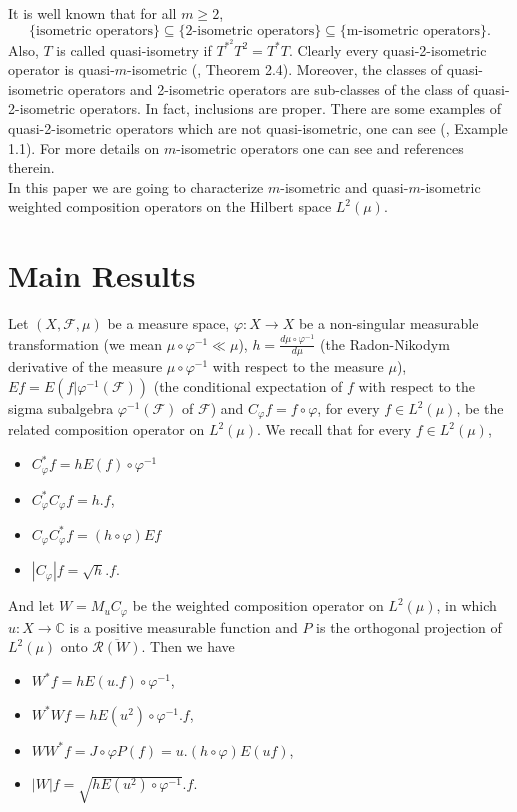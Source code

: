 \documentclass{amsart}
\theoremstyle{definition}\newtheorem{defn}[thm]{Definition}
\theoremstyle{remark}
\numberwithin{equation}{section}
\begin{document}
It is well known that for all $m\geq 2$,
$$\{\text{isometric operators}\} \subseteq \{\text{2-isometric operators}\} \subseteq \{\text{m-isometric operators}\}.$$
Also, $T$ is called quasi-isometry if $T^{*^2}T^2=T^*T$. Clearly every
quasi-2-isometric operator is quasi-$m$-isometric (\cite{mp1}, Theorem 2.4). Moreover, the
classes of quasi-isometric operators and 2-isometric operators are sub-classes of the
class of quasi-2-isometric operators. In fact, inclusions are proper. There are some examples of quasi-2-isometric operators which are not quasi-isometric, one can see (\cite{mp1}, Example 1.1). For more details on $m$-isometric operators one can see \cite{as3, ber, bj,bm,cot,jl,je,mp} and references therein.\\
In this paper we are going to characterize $m$-isometric and quasi-$m$-isometric weighted composition operators on the Hilbert space $L^2(\mu)$.


\section{ \sc\bf Main Results}

Let $(X, \mathcal{F}, \mu)$ be a measure space, $\varphi:X\rightarrow X$ be a non-singular measurable transformation (we mean $\mu\circ\varphi^{-1}\ll\mu$), $h=\frac{d\mu\circ\varphi^{-1}}{d\mu}$ (the Radon-Nikodym derivative of the measure $\mu\circ\varphi^{-1}$ with respect to the measure $\mu$), $Ef=E(f|\varphi^{-1}(\mathcal{F}))$ (the conditional expectation of $f$ with respect to the sigma subalgebra $\varphi^{-1}(\mathcal{F})$ of $\mathcal{F}$) and $C_{\varphi}f=f\circ\varphi$, for every $f\in L^2(\mu)$, be the related composition operator on $L^2(\mu)$.
We recall that for every $f\in L^2(\mu)$,
\begin{itemize}
 \item $C^*_{\varphi}f=hE(f)\circ\varphi^{-1}$
 \item $C^*_{\varphi}C_{\varphi}f=h.f$,
 \item $C_{\varphi}C^*_{\varphi}f=(h\circ\varphi)Ef$
 \item $|C_{\varphi}|f=\sqrt{h}.f$.
\end{itemize}
And let $W=M_uC_{\varphi}$ be the weighted composition operator on $L^2(\mu)$, in which $u:X\rightarrow \mathbb{C}$ is a positive measurable function and $P$ is the orthogonal projection of $L^2(\mu)$ onto $\overline{\mathcal{R}(W)}$. Then we have
\begin{itemize}
 \item $W^*f=hE(u.f)\circ\varphi^{-1}$,
 \item $W^*Wf=hE(u^2)\circ\varphi^{-1}.f$,
 \item $WW^*f=J\circ\varphi P(f)=u.(h\circ\varphi)E(uf)$,
 \item $|W|f=\sqrt{hE(u^2)\circ\varphi^{-1}}.f$.
\end{itemize}
\end{document}
